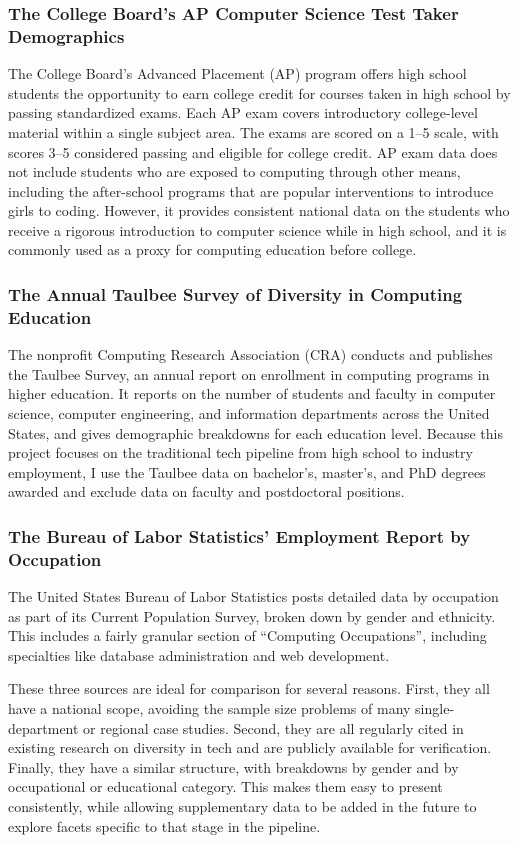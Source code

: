 \subsubsection*{The College Board's AP Computer Science Test Taker Demographics}
The College Board's Advanced Placement (AP) program offers high school students the opportunity to earn college credit for courses taken in high school by passing standardized exams. Each AP exam covers introductory college-level material within a single subject area. The exams are scored on a 1--5 scale, with scores 3--5 considered passing and eligible for college credit. AP exam data does not include students who are exposed to computing through other means, including the after-school programs that are popular interventions to introduce girls to coding. However, it provides consistent national data on the students who receive a rigorous introduction to computer science while in high school, and it is commonly used as a proxy for computing education before college.

\subsubsection*{The Annual Taulbee Survey of Diversity in Computing Education}
The nonprofit Computing Research Association (CRA) conducts and publishes the Taulbee Survey, an annual report on enrollment in computing programs in higher education. It reports on the number of students and faculty in computer science, computer engineering, and information departments across the United States, and gives demographic breakdowns for each education level. Because this project focuses on the traditional tech pipeline from high school to industry employment, I use the Taulbee data on bachelor's, master's, and PhD degrees awarded and exclude data on faculty and postdoctoral positions.

\subsubsection*{The Bureau of Labor Statistics' Employment Report by Occupation}
The United States Bureau of Labor Statistics posts detailed data by occupation as part of its Current Population Survey, broken down by gender and ethnicity. This includes a fairly granular section of ``Computing Occupations'', including specialties like database administration and web development.

These three sources are ideal for comparison for several reasons. First, they all have a national scope, avoiding the sample size problems of many single-department or regional case studies. Second, they are all regularly cited in existing research on diversity in tech and are publicly available for verification. Finally, they have a similar structure, with breakdowns by gender and by occupational or educational category. This makes them easy to present consistently, while allowing supplementary data to be added in the future to explore facets specific to that stage in the pipeline.
